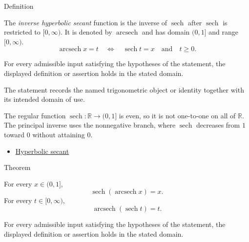 

\begin{definitionbox}{Definition}
\begin{definition}
\label{def:inverse-hyperbolic-secant}
The \emph{inverse hyperbolic secant} function is the inverse of
$\operatorname{sech}$ after $\operatorname{sech}$ is restricted to
$[0,\infty)$. It is denoted by $\operatorname{arcsech}$ and has domain
$(0,1]$ and range $[0,\infty)$.
\[
  \operatorname{arcsech} x=t
  \quad\Longleftrightarrow\quad
  \operatorname{sech} t=x
  \quad\text{and}\quad
  t\geq 0.
\]
\end{definition}
\end{definitionbox}
\begin{remark*}
For every admissible input satisfying the hypotheses of the statement, the
displayed definition or assertion holds in the stated domain.
\end{remark*}

\begin{remark*}[Interpretation]
The statement records the named trigonometric object or identity together with
its intended domain of use.
\end{remark*}

\begin{remark*}
The regular function $\operatorname{sech}:\mathbb{R}\to(0,1]$ is even, so it
is not one-to-one on all of $\mathbb{R}$. The principal inverse uses the
nonnegative branch, where $\operatorname{sech}$ decreases from $1$ toward
$0$ without attaining $0$.
\end{remark*}
\begin{dependencies}
\begin{itemize}
  \item \hyperref[def:hyperbolic-secant]{Hyperbolic secant}
\end{itemize}
\end{dependencies}

\begin{theorembox}{Theorem}
\begin{theorem}
\label{thm:inverse-hyperbolic-secant-identities}
For every $x\in(0,1]$,
\[
  \operatorname{sech}(\operatorname{arcsech} x)=x.
\]
For every $t\in[0,\infty)$,
\[
  \operatorname{arcsech}(\operatorname{sech} t)=t.
\]
\end{theorem}
\end{theorembox}
\begin{remark*}
For every admissible input satisfying the hypotheses of the statement, the
displayed definition or assertion holds in the stated domain.
\end{remark*}

